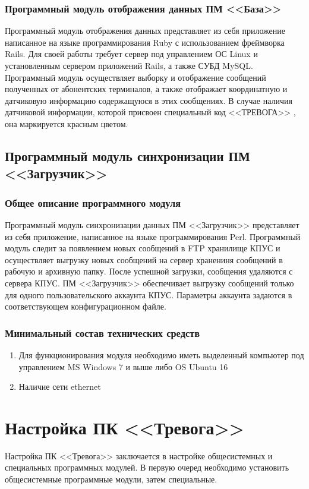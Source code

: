 \documentclass[12pt]{article}[a4paper,14pt,russian]
\begin{document}
	\subsubsection{Программный модуль отображения данных ПМ <<База>>}

	Программный модуль отображения данных представляет из себя приложение написанное
	на языке программирования Ruby с использованием фреймворка Rails. Для своей работы требует сервер под управлением ОС Linux и установленным сервером приложений Rails, а также СУБД MySQL. Программный модуль осуществляет выборку и отображение сообщений полученных от абонентских терминалов, а также отображает координатную и датчиковую информацию содержащуюся в этих сообщениях. В случае наличия датчиковой информации, которой присвоен специальный код <<ТРЕВОГА>> , она маркируется красным цветом.
	

	
	\subsection{Программный модуль синхронизации ПМ <<Загрузчик>>}
	\subsubsection{Общее описание программного модуля}
	Программный модуль синхронизации данных ПМ <<Загрузчик>>  представляет из себя приложение, написанное на
	языке программирования Perl. Программный модуль следит за появлением новых сообщений в FTP хранилище КПУС и осуществляет выгрузку новых сообщений на сервер хранениня сообщений в рабочую и архивную папку. После успешной загрузки, сообщения удаляются с сервера КПУС. ПМ <<Загрузчик>> обеспечивает выгрузку сообщений только для одного пользовательского аккаунта КПУС. Параметры аккаунта задаются в соответствующем конфигурационном файле.
	
	\subsubsection{Минимальный состав технических средств}

	\begin{enumerate}
	\item	Для функционирования модуля необходимо иметь выделенный компьютер под управлением
	MS Windows 7 и выше либо OS Ubuntu 16
	\item Наличие сети ethernet
	\end{enumerate}
	\section {Настройка ПК <<Тревога>>}
	Настройка ПК <<Тревога>> заключается в настройке общесистемных и специальных программных модулей. В первую очеред необходимо установить общесистемные программные модули, затем специальные. 
\end{document}

